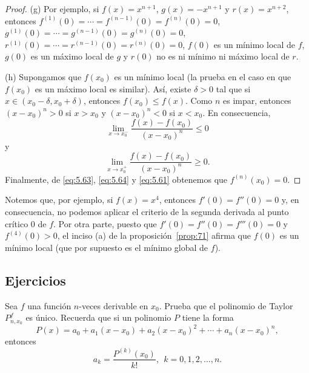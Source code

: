 \documentclass[12pt,a4paper]{book}
\begin{document}
\begin{proof}
        (g) Por ejemplo, si $f(x)=x^{n+1}$, $g(x)=-x^{n+1}$ y $r(x)=x^{n+2}$, entonces
        $f^{(1)}(0)=\cdots=f^{(n-1)}(0)=f^{(n)}(0)=0$, $g^{(1)}(0)=\cdots=g^{(n-1)}(0)=
        g^{(n)}(0)=0$, $r^{(1)}(0)=\cdots=r^{(n-1)}(0)=r^{(n)}(0)=0$, $f(0)$ es un mínimo
        local de $f$, $g(0)$ es un máximo local de $g$ y $r(0)$ no es ni mínimo ni máximo
        local de $r$.

        (h) Supongamos que $f(x_{0})$ es un mínimo local (la prueba en el caso
        en que $f(x_{0})$ es un máximo local es similar). Así, existe $\delta>0$ tal que si
        $x\in(x_{0}-\delta,x_{0}+\delta)$, entonces $f(x_{0})\leq f(x)$. Como $n$ es impar, entonces
        $(x-x_{0})^{n}>0$ si $x>x_{0}$ y $(x-x_{0})^{n}<0$ si $x<x_{0}$. En consecuencia,
        \begin{equation}\label{eq:5.63}
            \lim_{x\to x_{0}^{-}}\frac{f(x)-f(x_{0})}{(x-x_{0})^{n}}\leq 0
        \end{equation}
        y
        \begin{equation}\label{eq:5.64}
            \lim_{x\to x_{0}^{+}}\frac{f(x)-f(x_{0})}{(x-x_{0})^{n}}\geq 0.
        \end{equation}
        Finalmente, de \eqref{eq:5.63}, \eqref{eq:5.64} y \eqref{eq:5.61} obtenemos que $f^{(n)}(x_{0})=0$.
    \end{proof}

    Notemos que, por ejemplo, si $f(x)=x^{4}$, entonces $f'(0)=f''(0)=0$ y, en
    consecuencia, no podemos aplicar el criterio de la segunda derivada al punto
    crítico $0$ de $f$. Por otra parte, puesto que $f'(0)=f''(0)=f'''(0)=0$ y
    $f^{(4)}(0)>0$, el inciso (a) de la proposición~\ref{prop:71} afirma que $f(0)$ es un mínimo local
    (que por supuesto es el mínimo global de $f$).

    \par{}\subsection*{Ejercicios}

    \begin{ejercicio}\label{ej:318}
        Sea $f$ una función $n$-veces derivable en $x_{0}$. Prueba que el
        polinomio de Taylor $P^{f}_{n,x_{0}}$ es único. \sugerencia Recuerda que si un polinomio
        $P$ tiene la forma
        \begin{equation*}
            P(x)=a_{0}+a_{1}(x-x_{0})+a_{2}(x-x_{0})^{2}+\cdots+a_{n}(x-x_{0})^{n},
        \end{equation*}
        entonces
        \begin{equation*}
            a_{k}=\frac{P^{(k)}(x_{0})}{k!},\ \ k=0,1,2,\ldots,n.
        \end{equation*}
    \end{ejercicio}
\end{document}
